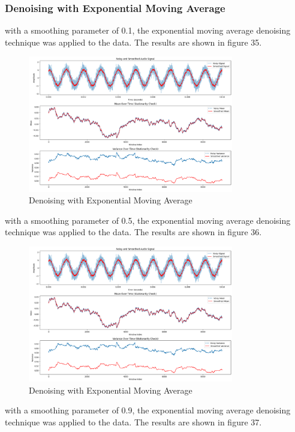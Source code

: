 \documentclass[a4paper,12pt]{article} %
\begin{document}
\subsubsection{ Denoising with Exponential Moving Average}
with a smoothing parameter of 0.1, the exponential moving average denoising technique was applied to the data. The results are shown in figure 35.
\begin{figure}[h]
\centering
\includegraphics[width=0.8\textwidth]{Q3_EMA_0.1.png}
\caption{Denoising with Exponential Moving Average}
\end{figure}
\clearpage
with a smoothing parameter of 0.5, the exponential moving average denoising technique was applied to the data. The results are shown in figure 36.
\begin{figure}[h]
\centering
\includegraphics[width=0.8\textwidth]{Q3_EMA_0.5.png}
\caption{Denoising with Exponential Moving Average}
\end{figure}
\clearpage
with a smoothing parameter of 0.9, the exponential moving average denoising technique was applied to the data. The results are shown in figure 37.
\end{document}
